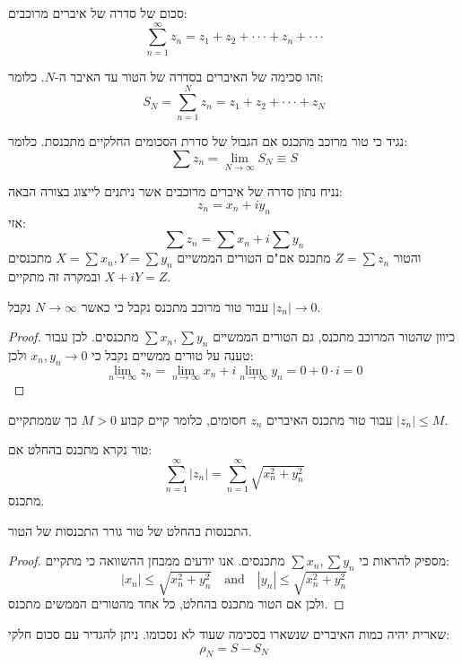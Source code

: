\documentclass{tstextbook}
\begin{document}
\begin{definition}
סכום של סדרה של איברים מרוכבים:
$$\sum_{n=1}^{\infty}z_{n}=z_{1}+z_{2}+\cdot\cdot\cdot+z_{n}+\cdot\cdot\cdot$$

\end{definition}
\begin{definition}
זהו סכימה של האיברים בסדרה של הטור עד האיבר ה-\(N\). כלומר:
$$S_{N}=\sum_{n=1}^{N}z_{n}=z_{1}+z_{2}+\cdot\cdot\cdot+z_{N}$$

\end{definition}
\begin{definition}
נגיד כי טור מרוכב מתכנס אם הגבול של סדרת הסכומים החלקיים מתכנסת. כלומר:
$$\sum z_{n}=\lim_{ N \to \infty } S_{N}\equiv S$$

\end{definition}
\begin{proposition}
נניח נתון סדרה של איברים מרוכבים אשר ניתנים לייצוג בצורה הבאה:
$$z_{n}=x_{n}+iy_{n}$$
אזי:
$$\sum z_{n}=\sum x_{n}+i\sum y_{n}$$
והטור \(Z=\sum z_{n}\) מתכנס אם"ם הטורים הממשיים \(X=\sum x_{n},Y=\sum y_{n}\) מתכנסים ובמקרה זה מתקיים \(X+iY=Z\).

\end{proposition}
\begin{proposition}
עבור טור מרוכב מתכנס נקבל כי כאשר \(N\to \infty\) נקבל \(\lvert z_{n} \rvert\to 0\).

\end{proposition}
\begin{proof}
כיוון שהטור המרוכב מתכנס, גם הטורים הממשיים \(\sum x_{n},\sum y_{n}\) מתכנסים. לכן עבור טענה על טורים ממשיים נקבל כי \(x_{n},y_{n}\to 0\) ולכן:
$$\operatorname*{lim}_{n\to\infty}z_{n}=\operatorname*{lim}_{n\to\infty}x_{n}+i\operatorname*{lim}_{n\to\infty}y_{n}=0+0\cdot i=0$$

\end{proof}
\begin{corollary}
עבור טור מתכנס האיברים \(z_{n}\) חסומים, כלומר קיים קבוע \(M>0\) כך שממתקיים \(\lvert z_{n} \rvert\leq M\).

\end{corollary}
\begin{definition}
טור נקרא מתכנס בהחלט אם:
$$\sum_{n=1}^{\infty}|z_{n}|=\sum_{n=1}^{\infty}\sqrt{x_{n}^{2}+y_{n}^{2}}$$
מתכנס.

\end{definition}
\begin{proposition}
התכנסות בהחלט של טור גורר התכנסות של הטור.

\end{proposition}
\begin{proof}
מספיק להראות כי \(\sum x_{n},\sum y_{n}\) מתכנסים. אנו יודעים ממבחן ההשוואה כי מתקיים:
$$|x_{n}|\leq{\sqrt{x_{n}^{2}+y_{n}^{2}}}\quad{\mathrm{and}}\quad|y_{n}|\leq{\sqrt{x_{n}^{2}+y_{n}^{2}}}$$
ולכן אם הטור מתכנס בהחלט, כל אחד מהטורים הממשים מתכנס.

\end{proof}
\begin{definition}
שארית יהיה כמות האיברים שנשארו בסכימה שעוד לא נסכומו. ניתן להגדיר עם סכום חלקי:
$$\rho_{N}=S-S_{N}$$

\end{definition}
\end{document}
